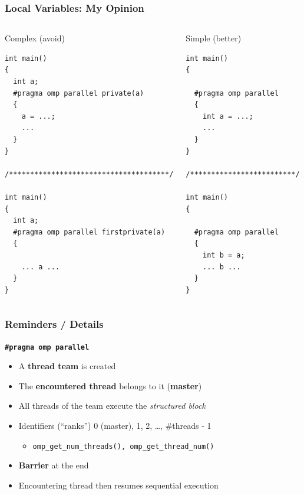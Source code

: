 \documentclass{beamer}
\begin{document}

\begin{frame}[fragile=singleslide]
  \frametitle{Local Variables: My Opinion}


  \begin{columns}[t]
  \column[T]{6cm}
  \begin{alertblock}{Complex (avoid)}
    \begin{verbatim}
int main()
{
  int a;
  #pragma omp parallel private(a)
  {
    a = ...;
    ...
  }
}

/**************************************/

int main()
{
  int a;
  #pragma omp parallel firstprivate(a)
  {

    ... a ...
  }
}

\end{verbatim}
\end{alertblock}

  \column[T]{4cm}
  \begin{exampleblock}{Simple (better)}
    \begin{verbatim}
int main()
{
  
  #pragma omp parallel
  {
    int a = ...;
    ...
  }
}

/*************************/

int main()
{
  
  #pragma omp parallel
  {
    int b = a;
    ... b ...
  }
}
\end{verbatim}
\end{exampleblock}
\end{columns}

\end{frame}

\begin{frame}[fragile=singleslide]
  \frametitle{Reminders / Details}
  
\begin{block}{\bf \texttt{\#pragma omp parallel}}
  \begin{itemize}
  \item A \alert{\textbf{thread team}} is created
  \item The \textbf{encountered thread} belongs to it (\textbf{master})
  \item All threads of the team execute the \textit{structured block}
  \item Identifiers (``ranks'') 0 (master), 1, 2, \dots, \#threads - 1
    \begin{itemize}
      \item \texttt{omp_get_num_threads(), omp_get_thread_num()}
    \end{itemize}
  \item \textbf{Barrier} at the end
  \item Encountering thread then resumes sequential execution
  \end{itemize}
\end{block}
\end{frame}
\end{document}
